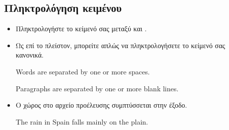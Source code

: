 \documentclass{beamer}
\begin{document}
\subsection{Πληκτρολόγηση κειμένου}
\begin{frame}[fragile]{\insertsubsection{}}
\small
\begin{itemize}
\item Πληκτρολογήστε το κείμενό σας μεταξύ \en {} \gr και \en {} \gr.
\item Ως επί το πλείστον, μπορείτε απλώς να πληκτρολογήσετε το κείμενό σας κανονικά.
\en
\begin{exampletwouptiny}
Words are separated by one or more
spaces.

Paragraphs are separated by one
or more blank lines.

\end{exampletwouptiny}
\gr
\item Ο χώρος στο αρχείο προέλευσης συμπτύσσεται στην έξοδο.
\en
\begin{exampletwouptiny}
The   rain       in Spain
falls mainly on the plain.
\end{exampletwouptiny}
\end{itemize}
\end{frame}
\gr
\end{document}
